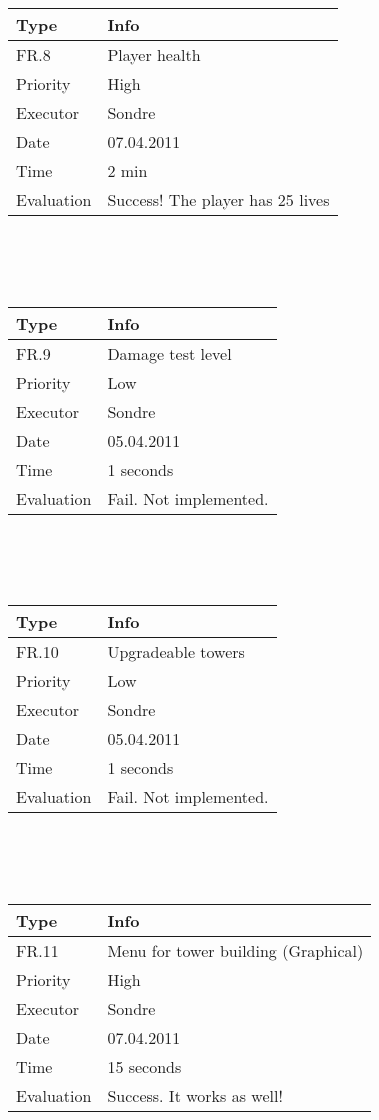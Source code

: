   \\
  \\
  \\
  \begin{tabular}{|l | p{10cm} |}
	\hline	
	\textbf{Type} & \textbf{Info} \\
	\hline
	FR.8 & Player health \\
	\hline
	Priority & High  \\
	\hline
	Executor & Sondre  \\
	\hline
	Date & 07.04.2011 \\
	\hline
	Time & 2 min \\
	\hline
	Evaluation & Success! The player has 25 lives \\
	\hline
  \end{tabular}
  \\
  \\
  \\
  \begin{tabular}{|l | p{10cm} |}
	\hline	
	\textbf{Type} & \textbf{Info} \\
	\hline
	FR.9 & Damage test level \\
	\hline
	Priority & Low  \\
	\hline
	Executor & Sondre  \\
	\hline
	Date & 05.04.2011 \\
	\hline
	Time & 1 seconds \\
	\hline
	Evaluation & Fail. Not implemented. \\
	\hline
  \end{tabular}
  \\
  \\
  \\
  \begin{tabular}{|l | p{10cm} |}
	\hline	
	\textbf{Type} & \textbf{Info} \\
	\hline
	FR.10 & Upgradeable towers \\
	\hline
	Priority & Low  \\
	\hline
	Executor & Sondre  \\
	\hline
	Date & 05.04.2011 \\
	\hline
	Time & 1 seconds \\
	\hline
	Evaluation & Fail. Not implemented. \\
	\hline
  \end{tabular}
  \\
  \\
  \\
  \begin{tabular}{|l | p{10cm} |}
	\hline	
	\textbf{Type} & \textbf{Info} \\
	\hline
	FR.11 & Menu for tower building (Graphical) \\
	\hline
	Priority & High  \\
	\hline
	Executor & Sondre  \\
	\hline
	Date & 07.04.2011 \\
	\hline
	Time & 15 seconds \\
	\hline
	Evaluation & Success. It works as well!  \\
	\hline
  \end{tabular}
